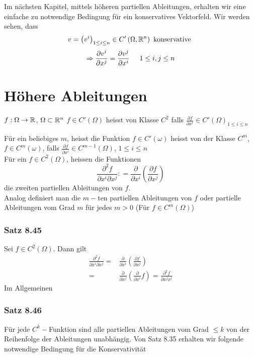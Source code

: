 Im nächsten Kapitel, mittels höheren partiellen Ableitungen, erhalten wir eine einfache zu  notwendige Bedingung für ein konservatives Vektorfeld. Wir werden sehen, dass
\[v = {\left( {{v^i}} \right)_{1 \le i \le n}} \in C'\left( {\Omega ,\mathbb{R}^n} \right)\text{ konservative }\]
\[\Rightarrow \frac{\partial v^i}{\partial x^j}=\frac{\partial v^j}{\partial x^i}\hspace{5mm}1\leq i,j\leq n\]

\section{Höhere Ableitungen}
\begin{definition}{8.44}
$f:\Omega\to\mathbb{R}$, $\Omega\subset\mathbb{R}^n$ $f\in C'\left( \Omega\right)$ heisst von Klasse $C^2$ falls $\frac{\partial f}{\partial x^i}\in C'{\left( \Omega\right)}_{1\leq i\leq n}$
\end{definition}
Für ein beliebiges $m$, heisst die Funktion $f\in C'\left( \omega\right)$ heisst von der Klasse $C^m$, $f\in C^m\left( \omega\right)$, falls $\frac{\partial f}{\partial x^i}\in C^{m-1}\left( \Omega\right)$, $1\leq i\leq n$\\

Für ein $f\in C^2\left( \Omega\right)$, heissen die Funktionen \[\frac{{{\partial ^2}f}}{{\partial {x^i}\partial {x^j}}}: = \frac{\partial }{{\partial {x^i}}}\left( {\frac{{\partial f}}{{\partial {x^j}}}} \right)\] die zweiten partiellen Ableitungen von $f$.\\

Analog definiert man die $m-$ten partiellen Ableitungen von $f$ oder partielle Ableitungen vom Grad $m$ für jedes $m>0$ (Für $f\in C^m \left(\Omega\right)$)

\subsubsection*{Satz 8.45}
Sei $f\in C^2\left(\Omega\right)$. Dann gilt
\begin{align*}
\frac{{{\partial ^2}f}}{{\partial {x^i}\partial {x^j}}} = &\frac{\partial }{{\partial {x^i}}}\left( {\frac{{\partial f}}{{\partial {x^j}}}} \right)\\
 = &\frac{\partial }{{\partial {x^j}}}\left( {\frac{\partial }{{\partial {x^i}}}f} \right) = \frac{{{\partial ^2}f}}{{\partial {x^j}{x^i}}}
\end{align*}
Im Allgemeinen
\subsubsection*{Satz 8.46}
Für jede $C^k-$Funktion sind alle partiellen Ableitungen vom Grad $\leq k$ von der Reihenfolge der Ableitungen unabhängig. Von Satz 8.35 erhalten wir folgende notwendige Bedingung für die Konservativität


